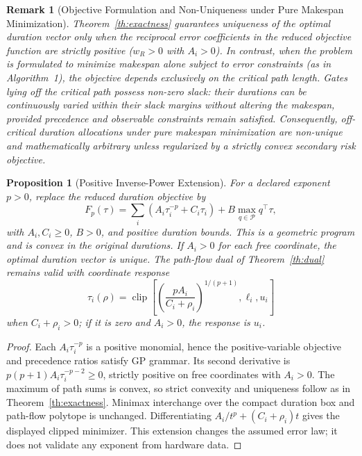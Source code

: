 \documentclass[10pt,letterpaper,journal]{IEEEtran}
\newtheorem{proposition}{Proposition}
\newtheorem{remark}{Remark}
\begin{document}
\begin{remark}[Objective Formulation and Non-Uniqueness under Pure Makespan Minimization]\label{rem:uniqueness}
Theorem~\ref{th:exactness} guarantees uniqueness of the optimal duration vector only when the reciprocal error coefficients in the reduced objective function are strictly positive ($w_R > 0$ with $A_i > 0$). In contrast, when the problem is formulated to minimize makespan alone subject to error constraints (as in Algorithm~1), the objective depends exclusively on the critical path length. Gates lying off the critical path possess non-zero slack: their durations can be continuously varied within their slack margins without altering the makespan, provided precedence and observable constraints remain satisfied. Consequently, off-critical duration allocations under pure makespan minimization are non-unique and mathematically arbitrary unless regularized by a strictly convex secondary risk objective.
\end{remark}

\begin{proposition}[Positive Inverse-Power Extension]\label{prop:power}
For a declared exponent $p>0$, replace the reduced duration objective by
\begin{equation}
F_p(\tau)=\sum_i\left(A_i\tau_i^{-p}+C_i\tau_i\right)+B\max_{q\in\mathcal P}q^\top\tau,
\end{equation}
with $A_i,C_i\ge0$, $B>0$, and positive duration bounds. This is a geometric program and is convex in the original durations. If $A_i>0$ for each free coordinate, the optimal duration vector is unique. The path-flow dual of Theorem~\ref{th:dual} remains valid with coordinate response
\begin{equation}
\tau_i(\rho)=\operatorname{clip}\!\left[\left(\frac{pA_i}{C_i+\rho_i}\right)^{1/(p+1)},\ell_i,u_i\right]
\end{equation}
when $C_i+\rho_i>0$; if it is zero and $A_i>0$, the response is $u_i$.
\end{proposition}
\begin{proof}
Each $A_i\tau_i^{-p}$ is a positive monomial, hence the positive-variable objective and precedence ratios satisfy GP grammar. Its second derivative is $p(p+1)A_i\tau_i^{-p-2}\ge0$, strictly positive on free coordinates with $A_i>0$. The maximum of path sums is convex, so strict convexity and uniqueness follow as in Theorem~\ref{th:exactness}. Minimax interchange over the compact duration box and path-flow polytope is unchanged. Differentiating $A_i/t^p+(C_i+\rho_i)t$ gives the displayed clipped minimizer. This extension changes the assumed error law; it does not validate any exponent from hardware data.
\end{proof}
\end{document}
